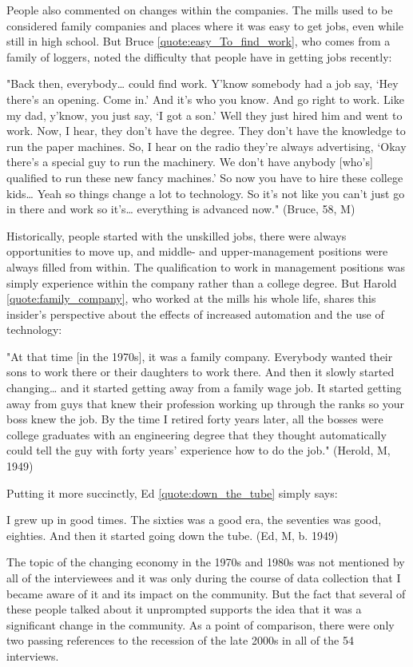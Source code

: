 People also commented on changes within the companies. The mills used to be considered family companies and places where it was easy to get jobs, even while still in high school. But Bruce \ref{quote:easy_To_find_work}, who comes from a family of loggers, noted the difficulty that people have in getting jobs recently:
\begin{num_quote}
    "Back then, everybody… could find work. Y'know somebody had a job say, ‘Hey there's an opening. Come in.' And it's who you know. And go right to work. Like my dad, y'know, you just say, ‘I got a son.' Well they just hired him and went to work. Now, I hear, they don't have the degree. They don't have the knowledge to run the paper machines. So, I hear on the radio they're always advertising, ‘Okay there's a special guy to run the machinery. We don't have anybody [who's] qualified to run these new fancy machines.' So now you have to hire these college kids… Yeah so things change a lot to technology. So it's not like you can't just go in there and work so it's… everything is advanced now." (Bruce, 58, M)
\label{quote:easy_To_find_work}
\end{num_quote}
Historically, people started with the unskilled jobs, there were always opportunities to move up, and middle- and upper-management positions were always filled from within. The qualification to work in management positions was simply experience within the company rather than a college degree. But Harold \ref{quote:family_company}, who worked at the mills his whole life, shares this insider's perspective about the effects of increased automation and the use of technology:
\begin{num_quote}
    "At that time [in the 1970s], it was a family company. Everybody wanted their sons to work there or their daughters to work there. And then it slowly started changing… and it started getting away from a family wage job. It started getting away from guys that knew their profession working up through the ranks so your boss knew the job. By the time I retired forty years later, all the bosses were college graduates with an engineering degree that they thought automatically could tell the guy with forty years' experience how to do the job." (Herold, M, 1949)
\label{quote:family_company}
\end{num_quote}
Putting it more succinctly, Ed \ref{quote:down_the_tube} simply says:
\begin{num_quote}
I grew up in good times. The sixties was a good era, the seventies was good, eighties. And then it started going down the tube. (Ed, M, b. 1949)
\label{quote:down_the_tube}
\end{num_quote}
The topic of the changing economy in the 1970s and 1980s was not mentioned by all of the interviewees and it was only during the course of data collection that I became aware of it and its impact on the community. But the fact that several of these people talked about it unprompted supports the idea that it was a significant change in the community. As a point of comparison, there were only two passing references to the recession of the late 2000s in all of the 54 interviews.

